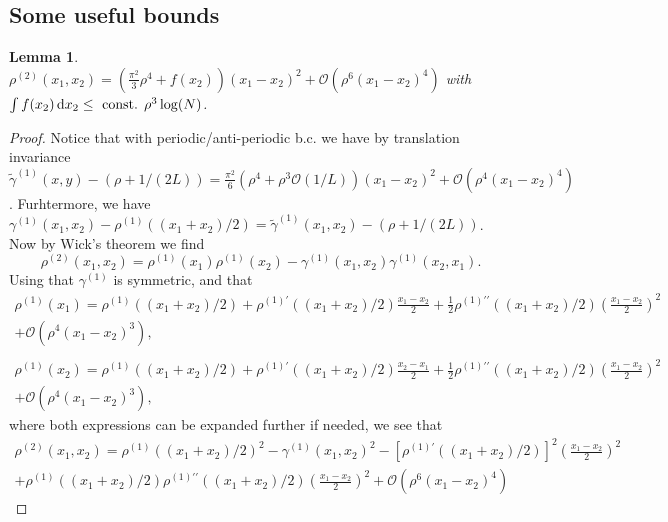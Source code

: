 \documentclass[a4paper,11pt]{article}
\newcommand*\diff{\mathop{}\!\mathrm{d}}
\newtheorem{lemma}{Lemma}
\numberwithin{equation}{section}
\begin{document}
	\subsection{Some useful bounds}
	\begin{lemma}\label{Lemma rho2 bound}
		$ \rho^{(2)}(x_1,x_2)=\left(\frac{\pi^2}{3}\rho^4+f(x_2)\right)(x_1-x_2)^2+\mathcal{O}(\rho^6(x_1-x_2)^4) $ with $ \int f(x_2)\diff x_2\leq \textnormal{ const. }\rho^3\log(N) $.
	\end{lemma}
	\begin{proof}
		Notice that with periodic/anti-periodic b.c. we have by translation invariance $ \tilde{\gamma}^{(1)}(x,y)-(\rho+1/(2L))=\frac{\pi^2}{6}(\rho^4+\rho^3\mathcal{O}(1/L))(x_1-x_2)^2+\mathcal{O}(\rho^4(x_1-x_2)^4) $. Furhtermore, we have $ \gamma^{(1)}(x_1,x_2)-\rho^{(1)}\left((x_1+x_2)/2\right)=\tilde{\gamma}^{(1)}(x_1,x_2)-(\rho+1/(2L)) $. Now by Wick's theorem we find \begin{equation}
		\rho^{(2)}(x_1,x_2)=\rho^{(1)}(x_1)\rho^{(1)}(x_2)-\gamma^{(1)}(x_1,x_2)\gamma^{(1)}(x_2,x_1).
		\end{equation}
		Using that $ \gamma^{(1)} $ is symmetric, and that \begin{equation}
		\begin{aligned}
		\rho^{(1)}(x_1)=\rho^{(1)}((x_1+x_2)/2)+\rho^{(1)\prime}((x_1+x_2)/2)\frac{x_1-x_2}{2}+\frac{1}{2}\rho^{(1)\prime\prime}((x_1+x_2)/2)\left(\frac{x_1-x_2}{2}\right)^2\\+\mathcal{O}(\rho^4(x_1-x_2)^3),\\
		\end{aligned}
		\end{equation}
		\begin{equation}
		\begin{aligned}
		\rho^{(1)}(x_2)=\rho^{(1)}((x_1+x_2)/2)+\rho^{(1)\prime}((x_1+x_2)/2)\frac{x_2-x_1}{2}+\frac{1}{2}\rho^{(1)\prime\prime}((x_1+x_2)/2)\left(\frac{x_1-x_2}{2}\right)^2\\+\mathcal{O}(\rho^4(x_1-x_2)^3),
		\end{aligned}
		\end{equation}
		where both expressions can be expanded further if needed, we see that \begin{equation}
		\begin{aligned}
		\rho^{(2)}(x_1,x_2)=\rho^{(1)}((x_1+x_2)/2)^2-\gamma^{(1)}(x_1,x_2)^2-\left[\rho^{(1)\prime}((x_1+x_2)/2)\right]^2\left(\frac{x_1-x_2}{2}\right)^2\\+\rho^{(1)}((x_1+x_2)/2)\rho^{(1)\prime\prime}((x_1+x_2)/2)\left(\frac{x_1-x_2}{2}\right)^2+\mathcal{O}(\rho^6(x_1-x_2)^4)

\end{aligned}
\end{equation}
\end{proof}
\end{document}
